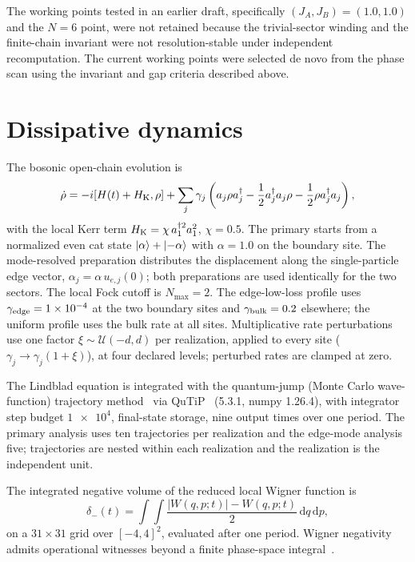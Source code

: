 \documentclass[aps,pra,preprint,superscriptaddress,amsmath,amssymb]{revtex4-2}
\newcommand{\dd}{\mathrm{d}}
\begin{document}
{\sloppy The working points tested in an earlier draft, specifically $(J_A,J_B)=(\num{1.0},\num{1.0})$ and the $N=\num{6}$ point, were not retained because the trivial-sector winding and the finite-chain invariant were not resolution-stable under independent recomputation. The current working points were selected de novo from the phase scan using the invariant and gap criteria described above.\par}

\section{Dissipative dynamics}
\label{sec:dynamics}

The bosonic open-chain evolution is
\begin{equation}\label{eq:lindblad}
\dot\rho=-i[H(t)+H_{\rm K},\rho]
+\sum_j\gamma_j\left(a_j\rho a_j^\dagger-\frac{1}{2}a_j^\dagger a_j\rho-\frac{1}{2}\rho a_j^\dagger a_j\right),
\end{equation}
with the local Kerr term $H_{\rm K}=\chi\,a_1^{\dagger 2}a_1^2$, $\chi=\num{0.5}$. The primary starts from a normalized even cat state $\ket{\alpha}+\ket{-\alpha}$ with $\alpha=\num{1.0}$ on the boundary site. The mode-resolved preparation distributes the displacement along the single-particle edge vector, $\alpha_j=\alpha\,u_{e,j}(0)$; both preparations are used identically for the two sectors. The local Fock cutoff is $N_{\max}=\num{2}$. The edge-low-loss profile uses $\gamma_{\rm edge}=\num{1e-4}$ at the two boundary sites and $\gamma_{\rm bulk}=\num{0.2}$ elsewhere; the uniform profile uses the bulk rate at all sites. Multiplicative rate perturbations use one factor $\xi\sim\mathcal{U}(-d,d)$ per realization, applied to every site ($\gamma_j\to\gamma_j(1+\xi)$), at four declared levels; perturbed rates are clamped at zero.

The Lindblad equation is integrated with the quantum-jump (Monte Carlo wave-function) trajectory method~\cite{Dalibard1992} via QuTiP~\cite{Johansson2013} (5.3.1, numpy 1.26.4), with integrator step budget $\num[retain-unity-mantissa = false]{1e4}$, final-state storage, nine output times over one period. The primary analysis uses ten trajectories per realization and the edge-mode analysis five; trajectories are nested within each realization and the realization is the independent unit.

The integrated negative volume of the reduced local Wigner function is
\begin{equation}\label{eq:neg}
\delta_{-}(t)=\int\!\int\frac{|W(q,p;t)|-W(q,p;t)}{2}\,\dd q\,\dd p,
\end{equation}
on a $\num{31}\times\num{31}$ grid over $[-4,4]^2$, evaluated after one period. Wigner negativity admits operational witnesses beyond a finite phase-space integral~\cite{Chabaud2021witnessingwigner,Zaw2024}.
\end{document}
